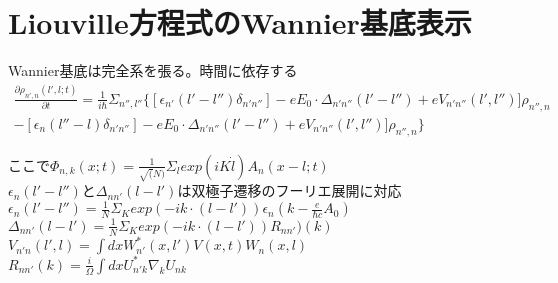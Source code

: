 \documentclass[11pt]{jarticle}
\begin{document}
\section{Liouville方程式のWannier基底表示}
Wannier基底は完全系を張る。時間に依存する
\cite{Iafrate}
\begin{eqnarray*}
\frac{ \partial \rho_{n',n}(l', l; t) }{\partial t } = \frac{1}{i \hbar} \Sigma_{n'',l''} \{ [ \epsilon_{n'}(l'-l'') \delta_{n'n''} ] - eE_0 \cdot \Delta_{n'n''}(l'-l'') + eV_{n'n''}(l', l'')] \rho_{n'',n}\\
- [ \epsilon_{n}(l''-l) \delta_{n'n''} ] - eE_0 \cdot \Delta_{n'n''}(l'-l'') + eV_{n'n''}(l', l'')] \rho_{n'',n} \}
\end{eqnarray*}

ここで$\Phi_{n,k}(x;t) = \frac{1}{\sqrt (N)} \Sigma_{l} exp(iK \dot l) A_n(x-l; t)$\\
$\epsilon_{n}(l'-l'')$と$\Delta_{nn'}(l-l')$は双極子遷移のフーリエ展開に対応\\
$\epsilon_{n}(l'-l'') =\frac{1}{N} \Sigma_K exp(-ik \cdot (l-l') ) \epsilon_n(k-\frac{e}{\hbar c}A_0)$\\
$\Delta_{nn'}(l-l')=\frac{1}{N}\Sigma_K exp(-ik \cdot (l-l') ) R_{nn'})(k) $\\
$V_{n'n}(l',l)= \int dx W^*_{n'}(x,l') V(x,t) W_n (x,l) $\\
$R_{nn'}(k) = \frac{i}{\Omega} \int dx U^*_{n'k} \nabla_k U_{nk}$\\




\end{document}
